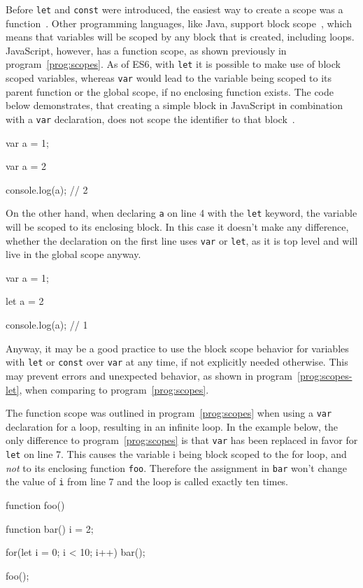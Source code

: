 Before \texttt{let} and \texttt{const} were introduced, the easiest way to create a scope was a function~\cite[p.~7]{YDKJS:ES6AndBeyond:Simpson:2015}. Other programming languages, like Java, support block scope~\cite[p.~7]{YDKJS:ScopesAndClosures:Simpson:2014}, which means that variables will be scoped by any block that is created, including loops. JavaScript, however, has a function scope, as shown previously in program~\ref{prog:scopes}. As of ES6, with \texttt{let} it is possible to make use of block scoped variables, whereas \texttt{var} would lead to the variable being scoped to its parent function or the global scope, if no enclosing function exists. The code below demonstrates, that creating a simple block in JavaScript in combination with a \texttt{var} declaration, does not scope the identifier to that block~\cite[p.~8]{YDKJS:ES6AndBeyond:Simpson:2015}.
\begin{JsCode}
var a = 1;

{
  var a = 2
}

console.log(a); // 2
\end{JsCode}
On the other hand, when declaring \texttt{a} on line 4 with the \texttt{let} keyword, the variable will be scoped to its enclosing block. In this case it doesn't make any difference, whether the declaration on the first line uses \texttt{var} or \texttt{let}, as it is top level and will live in the global scope anyway.
\begin{JsCode}
var a = 1;

{
  let a = 2
}

console.log(a); // 1
\end{JsCode}
Anyway, it may be a good practice to use the block scope behavior for variables with \texttt{let} or \texttt{const} over \texttt{var} at any time, if not explicitly needed otherwise. This may prevent errors and unexpected behavior, as shown in program~\ref{prog:scopes-let}, when comparing to program~\ref{prog:scopes}.

\begin{program}
\caption{The function scope was outlined in program~\ref{prog:scopes} when using a \texttt{var} declaration for a loop, resulting in an infinite loop. In the example below, the only difference to program~\ref{prog:scopes} is that \texttt{var} has been replaced in favor for \texttt{let} on line 7. This causes the variable i being block scoped to the for loop, and \emph{not} to its enclosing function \texttt{foo}. Therefore the assignment in \texttt{bar} won't change the value of \texttt{i} from line 7 and the loop is called exactly ten times.}
\label{prog:scopes-let}
\begin{JsCode}
function foo() {

  function bar() {
    i = 2;
  }
  
  for(let i = 0; i < 10; i++) {
    bar();
  }
  
}

foo();
\end{JsCode}
\end{program}

